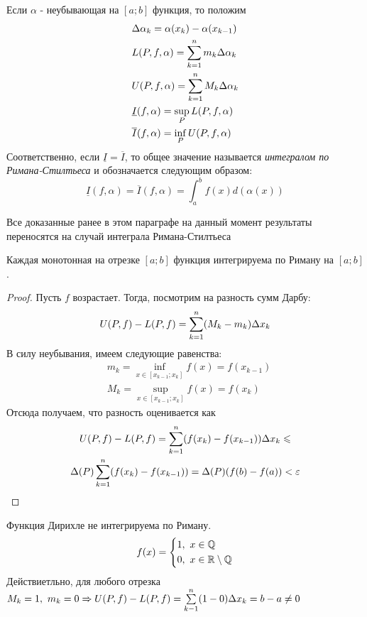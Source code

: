 \begin{definition}
	Если $\alpha$ - неубывающая на $[a; b]$ функция, то положим
	\begin{align*}
		&{\Delta \alpha_k = \alpha(x_k) - \alpha(x_{k - 1})}
		\\
		&{L(P, f, \alpha) = \sum\limits_{k = 1}^n m_k \Delta \alpha_k}
		\\
		&{U(P, f, \alpha) = \sum\limits_{k = 1}^n M_k \Delta \alpha_k}
		\\
		&{\underline{I}(f, \alpha) = \sup\limits_P L(P, f, \alpha)}
		\\
		&{\overline{I}(f, \alpha) = \inf\limits_P U(P, f, \alpha)}
	\end{align*}
	Соответственно, если $\underline{I} = \overline{I}$, то общее значение называется \textit{интегралом по Римана-Стилтьеса} и обозначается следующим образом:
	\[
		\underline{I}(f, \alpha) = \overline{I}(f, \alpha) = \int_a^b f(x) d(\alpha(x))
	\]
\end{definition}

\begin{note}
	Все доказанные ранее в этом параграфе на данный момент результаты переносятся на случай интеграла Римана-Стилтьеса
\end{note}

\begin{theorem}
	Каждая монотонная на отрезке $[a; b]$ функция интегрируема по Риману на $[a; b]$.
\end{theorem}

\begin{proof}
	Пусть $f$ возрастает. Тогда, посмотрим на разность сумм Дарбу:
	\[
		U(P, f) - L(P, f) = \sum\limits_{k = 1}^n (M_k - m_k) \Delta x_k
	\]
	В силу неубывания, имеем следующие равенства:
	\begin{align*}
		&{m_k = \inf\limits_{x \in [x_{k - 1}; x_k]} f(x) = f(x_{k - 1})}
		\\
		&{M_k = \sup\limits_{x \in [x_{k - 1}; x_k]} f(x) = f(x_k)}
	\end{align*}
	Отсюда получаем, что разность оценивается как
	\begin{multline*}
		U(P, f) - L(P, f) = \sum\limits_{k = 1}^n (f(x_k) - f(x_{k - 1})) \Delta x_k \leqslant
		\\
		\Delta(P) \sum\limits_{k = 1}^n (f(x_k) - f(x_{k - 1})) = \Delta(P)(f(b) - f(a)) < \varepsilon
	\end{multline*}
\end{proof}

\begin{example}
	Функция Дирихле не интегрируема по Риману.
	\[
		f(x) = \left\{\begin{aligned}
			&1,\ x\in \mathbb{Q}
			\\
			&0,\ x\in \mathbb{R} \setminus \mathbb{Q}
		\end{aligned}\right.
	\]
	Действиетльно, для любого отрезка $M_k = 1,\ m_k = 0 \Rightarrow U(P, f) - L(P, f) = \sum\limits_{k - 1}^n(1 - 0)\Delta x_k = b - a \neq 0$
\end{example}

